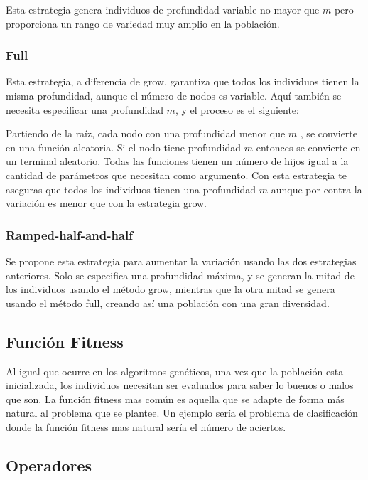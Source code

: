 \documentclass[12pt]{article} \usepackage[utf8x]{inputenc}
\begin{document}
Esta estrategia genera individuos de profundidad variable no mayor que
\(m\) pero proporciona un rango de variedad muy amplio en la población.

\subsubsection{Full}

Esta estrategia, a diferencia de grow, garantiza que todos los
individuos tienen la misma profundidad, aunque el número de nodos es
variable. Aquí también se necesita especificar una profundidad \(m\),
y el proceso es el siguiente:

Partiendo de la raíz, cada nodo con una profundidad menor que \(m\)
, se convierte en una función aleatoria. Si el nodo tiene profundidad
\(m\) entonces se convierte en un terminal aleatorio. Todas las funciones
tienen un número de hijos igual a la cantidad de parámetros que necesitan
como argumento. Con esta estrategia te aseguras que todos los individuos
tienen una profundidad \(m\) aunque por contra la variación es menor
que con la estrategia grow.\\

\subsubsection{Ramped-half-and-half}

Se propone esta estrategia para aumentar la variación usando las dos
estrategias anteriores. Solo se especifica una profundidad máxima, y
se generan la mitad de los individuos usando el método grow, mientras
que la otra mitad se genera usando el método full, creando así una
población con una gran diversidad.

\subsection{Función Fitness}

Al igual que ocurre en los algoritmos genéticos, una vez que la
población esta inicializada, los individuos necesitan ser evaluados
para saber lo buenos o malos que son. La función fitness mas
común es aquella que se adapte de forma más natural al problema que se
plantee. Un ejemplo sería el problema de clasificación donde la
función fitness mas natural sería el número de aciertos.

\subsection{Operadores}
\end{document}
